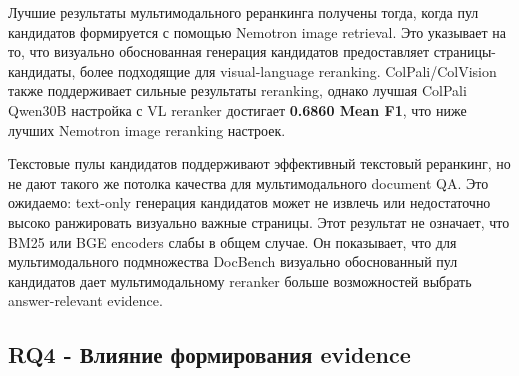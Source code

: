\documentclass[conference]{IEEEtran}
\begin{document}
\begin{table}[t]
\caption{Таблица 6}
\centering
\scriptsize
{}
\end{table}

Лучшие результаты мультимодального реранкинга получены тогда, когда пул кандидатов формируется с помощью Nemotron image retrieval. Это указывает на то, что визуально обоснованная генерация кандидатов предоставляет страницы-кандидаты, более подходящие для visual-language reranking. ColPali/ColVision также поддерживает сильные результаты reranking, однако лучшая ColPali Qwen30B настройка с VL reranker достигает \textbf{0.6860 Mean F1}, что ниже лучших Nemotron image reranking настроек.

Текстовые пулы кандидатов поддерживают эффективный текстовый реранкинг, но не дают такого же потолка качества для мультимодального document QA. Это ожидаемо: text-only генерация кандидатов может не извлечь или недостаточно высоко ранжировать визуально важные страницы. Этот результат не означает, что BM25 или BGE encoders слабы в общем случае. Он показывает, что для мультимодального подмножества DocBench визуально обоснованный пул кандидатов дает мультимодальному reranker больше возможностей выбрать answer-relevant evidence.

\subsection{RQ4 - Влияние формирования evidence}
\end{document}
